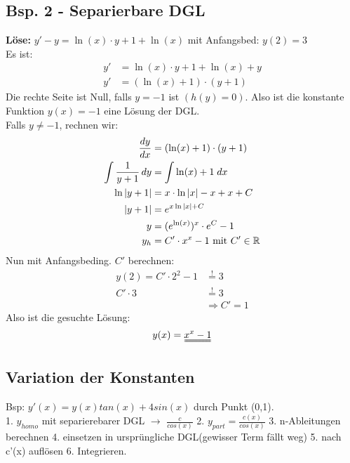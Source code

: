 \subsection{Bsp. 2 - Separierbare DGL}
\textbf{Löse:} $y' - y = \ln(x) \cdot y + 1 + \ln(x)$ mit Anfangsbed: $y(2) = 3$\\
Es ist:
\begin{align*}
	y' &= \ln(x) \cdot y + 1 + \ln(x) + y \\ 
	y' &= (\ln(x) + 1) \cdot (y + 1)
\end{align*}
Die rechte Seite ist Null, falls $y = -1$ ist $(h(y) = 0)$. Also ist die konstante Funktion $y(x) = -1$ eine Lösung der DGL.\\ Falls $y \neq -1$, rechnen wir:
\begin{align*}
	\frac{dy}{dx} &= (\ln(x) + 1) \cdot (y + 1) \\
	\int \frac{1}{y + 1} \, dy &= \int \ln(x) + 1 \; dx\\
	\ln|y + 1| &= x \cdot \ln|x| - x + x + C \\
	|y + 1| &= e^{x \ln|x| + C} \\
	y &= (e^{\ln(x)})^x \cdot e^C - 1\\
	y_h &= C' \cdot x^x -1 \text{ mit } C' \in \mathbb{R}
\end{align*}
Nun mit Anfangsbeding. $C'$ berechnen:
\begin{align*}
	y(2) = C' \cdot 2^2 -1 &\overset{!}{=} 3 \\
	C' \cdot 3 &\overset{!}{=} 3 \\
	&\Rightarrow C' = 1
\end{align*}
Also ist die gesuchte Lösung:
\[
	y(x) = \uuline{x^x -1}
\]
\subsection{Variation der Konstanten}
\begin{footnotesize}
Bsp: $y'(x) = y(x)tan(x) + 4sin(x)$ durch Punkt (0,1).\\
1. $y_{homo}$ mit separierebarer DGL $\rightarrow$ $\frac{c}{cos(x)}$ 2. $y_{part} = \frac{c(x)}{cos(x)}$ 3. n-Ableitungen berechnen 4. einsetzen in ursprüngliche DGL(gewisser Term fällt weg) 5. nach c'(x) auflösen 6. Integrieren.
\end{footnotesize}
